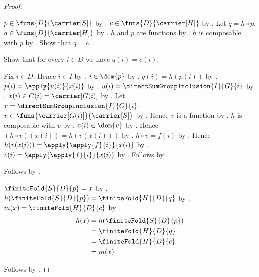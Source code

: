 \begin{proof}
\begin{subproof}
        $p\in\funs{D}{\carrier[S]}$ by
            .
        $c\in\funs{D}{\carrier[H]}$ by
            .
        Let $q=h\circ p$.
        $q\in\funs{D}{\carrier[H]}$ by
            .
        $h$ and $p$ are functions by
            .
        $h$ is composable with $p$ by
            .
        Show that $q=c$.
        \begin{subproof}
            Show that for every $i\in D$ we have $q(i)=c(i)$.
            \begin{subproof}
                Fix $i\in D$.
                Hence $i\in I$ by .
                $i\in\dom{p}$ by .
                $q(i)=h(p(i))$ by .
                $p(i)=\apply{u(i)}{x(i)}$ by
                    .
                $u(i)=\directSumGroupInclusion{I}{G}{i}$ by
                    .
                $x(i)\in C(i)=\carrier[G(i)]$ by
                    .
                Let $v=\directSumGroupInclusion{I}{G}{i}$.
                $v\in\funs{\carrier[G(i)]}{\carrier[S]}$ by
                    .
                Hence $v$ is a function by .
                $h$ is composable with $v$ by
                    .
                $x(i)\in\dom{v}$ by .
                Hence $(h\circ v)(x(i))=h(v(x(i)))$ by
                    .
                $h\circ v=f(i)$ by \auto.
                Hence $h(v(x(i)))=\apply{\apply{f}{i}}{x(i)}$ by
                    \auto.
                $c(i)=\apply{\apply{f}{i}}{x(i)}$ by
                    .
                Follows by \auto.
            \end{subproof}
            Follows by .
        \end{subproof}
        $\finiteFold{S}{D}{p}=x$ by
            .
        $h(\finiteFold{S}{D}{p})=\finiteFold{H}{D}{q}$ by
            .
        $m(x)=\finiteFold{H}{D}{c}$ by
            .
        \begin{align*}
            h(x)
                &= h(\finiteFold{S}{D}{p})
                \\
                &= \finiteFold{H}{D}{q}
                \\
                &= \finiteFold{H}{D}{c}
                \\
                &= m(x)
        \end{align*}
    \end{subproof}
    Follows by .
\end{proof}

